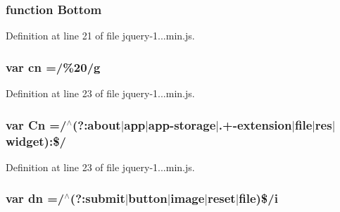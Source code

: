 \subsubsection[{Bottom}]{\setlength{\rightskip}{0pt plus 5cm}function Bottom}\label{_scripts_2jquery-1_810_82_8min_8js_aff76c1cba4a00c678dfce0e0c5a5538a}


Definition at line 21 of file jquery-\/1...\+min.\+js.

\hypertarget{_scripts_2jquery-1_810_82_8min_8js_a43c2bda2537661fb64e62fdfdcea1560}{}
\subsubsection[{cn}]{\setlength{\rightskip}{0pt plus 5cm}var cn =/\%20/{\bf g}}\label{_scripts_2jquery-1_810_82_8min_8js_a43c2bda2537661fb64e62fdfdcea1560}


Definition at line 23 of file jquery-\/1...\+min.\+js.

\hypertarget{_scripts_2jquery-1_810_82_8min_8js_ab832fcb3f80f807f0b65d1e3b4904de8}{}
\subsubsection[{Cn}]{\setlength{\rightskip}{0pt plus 5cm}var Cn =/$^\wedge$(?\+:about$\vert$app$\vert$app-\/storage$\vert$.+-\/extension$\vert$file$\vert$res$\vert$widget)\+:\$/}\label{_scripts_2jquery-1_810_82_8min_8js_ab832fcb3f80f807f0b65d1e3b4904de8}


Definition at line 23 of file jquery-\/1...\+min.\+js.

\hypertarget{_scripts_2jquery-1_810_82_8min_8js_ab5e3f3e2b2507b73e2d8092caa5c8650}{}
\subsubsection[{dn}]{\setlength{\rightskip}{0pt plus 5cm}var dn =/$^\wedge$(?\+:submit$\vert${\bf button}$\vert$image$\vert$reset$\vert$file)\$/{\bf i}}\label{_scripts_2jquery-1_810_82_8min_8js_ab5e3f3e2b2507b73e2d8092caa5c8650}


